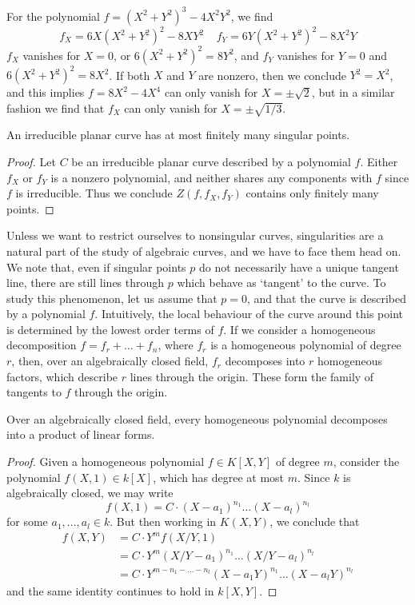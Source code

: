 \begin{example}
    For the polynomial $f = (X^2 + Y^2)^3 - 4X^2Y^2$, we find
    \[ f_X = 6X(X^2 + Y^2)^2 - 8XY^2\ \ \ \ \ f_Y = 6Y(X^2 + Y^2)^2 - 8X^2Y \]
    $f_X$ vanishes for $X = 0$, or $6(X^2 + Y^2)^2 = 8Y^2$, and $f_Y$ vanishes for $Y = 0$ and $6(X^2 + Y^2)^2 = 8X^2$. If both $X$ and $Y$ are nonzero, then we conclude $Y^2 = X^2$, and this implies $f = 8X^2 - 4X^4$ can only vanish for $X = \pm \sqrt{2}$, but in a similar fashion we find that $f_X$ can only vanish for $X = \pm \sqrt{1/3}$.
\end{example}

\begin{theorem}
    An irreducible planar curve has at most finitely many singular points.
\end{theorem}
\begin{proof}
    Let $C$ be an irreducible planar curve described by a polynomial $f$. Either $f_X$ or $f_Y$ is a nonzero polynomial, and neither shares any components with $f$ since $f$ is irreducible. Thus we conclude $Z(f,f_X,f_Y)$ contains only finitely many points.
\end{proof}

Unless we want to restrict ourselves to nonsingular curves, singularities are a natural part of the study of algebraic curves, and we have to face them head on. We note that, even if singular points $p$ do not necessarily have a unique tangent line, there are still lines through $p$ which behave as `tangent' to the curve. To study this phenomenon, let us assume that $p = 0$, and that the curve is described by a polynomial $f$. Intuitively, the local behaviour of the curve around this point is determined by the lowest order terms of $f$. If we consider a homogeneous decomposition $f = f_r + \dots + f_n$, where $f_r$ is a homogeneous polynomial of degree $r$, then, over an algebraically closed field, $f_r$ decomposes into $r$ homogeneous factors, which describe $r$ lines through the origin. These form the family of tangents to $f$ through the origin.

\begin{lemma}
    Over an algebraically closed field, every homogeneous polynomial decomposes into a product of linear forms.
\end{lemma}
\begin{proof}
    Given a homogeneous polynomial $f \in K[X,Y]$ of degree $m$, consider the polynomial $f(X,1) \in k[X]$, which has degree at most $m$. Since $k$ is algebraically closed, we may write
    \[ f(X,1) = C \cdot (X - a_1)^{n_1} \dots (X - a_l)^{n_l} \]
    for some $a_1,\dots,a_l \in k$. But then working in $K(X,Y)$, we conclude that
    \begin{align*}
        f(X,Y) &= C \cdot Y^m f(X/Y,1)\\
        &= C \cdot Y^m (X/Y - a_1)^{n_1} \dots (X/Y - a_l)^{n_l}\\
        &= C \cdot Y^{m-n_1-\dots-n_l} (X - a_1 Y)^{n_1} \dots (X - a_l Y)^{n_l}
    \end{align*}
    and the same identity continues to hold in $k[X,Y]$.
\end{proof}

